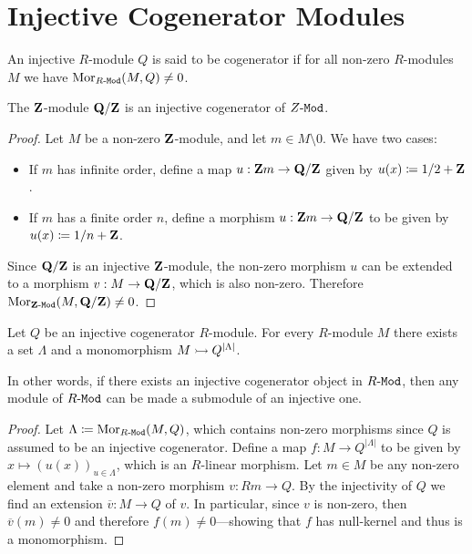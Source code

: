 \section{Injective Cogenerator Modules}

\begin{definition}
\label{def:injective-cogenerator}
An injective \(R\)-module \(Q\) is said to be cogenerator if for all non-zero
\(R\)-modules \(M\) we have \(\operatorname{Mor}_{{R\text{-}\texttt{Mod}}}(M, Q) \neq 0\).
\end{definition}

\begin{lemma}
\label{lem:QZ-is-injective-cogenerator}
The \(\mathbf{Z}\)-module \(\mathbf{Q}/\mathbf{Z}\) is an injective cogenerator of \({Z\text{-}\texttt{Mod}}\).
\end{lemma}

\begin{proof}
Let \(M\) be a non-zero \(\mathbf{Z}\)-module, and let \(m \in M \setminus 0\). We have two cases:
\begin{itemize}\setlength\itemsep{0em}
\item If \(m\) has infinite order, define a map \(u: \mathbf{Z} m \to \mathbf{Q}/\mathbf{Z}\) given by
  \(u(x) \coloneq 1/2 + \mathbf{Z}\).
\item If \(m\) has a finite order \(n\), define a morphism \(u: \mathbf{Z} m \to \mathbf{Q}/\mathbf{Z}\)
  to be given by \(u(x) \coloneq 1/n + \mathbf{Z}\).
\end{itemize}
Since \(\mathbf{Q}/\mathbf{Z}\) is an injective \(\mathbf{Z}\)-module, the non-zero morphism \(u\) can
be extended to a morphism \(v: M \to \mathbf{Q}/\mathbf{Z}\), which is also non-zero. Therefore
\(\operatorname{Mor}_{{\mathbf{Z}\text{-}\texttt{Mod}}}(M, \mathbf{Q}/\mathbf{Z}) \neq 0\).
\end{proof}

\begin{proposition}
\label{prop:inj-cogenerator-product-submodules}
Let \(Q\) be an injective cogenerator \(R\)-module. For every \(R\)-module \(M\)
there exists a set \(\Lambda\) and a monomorphism \(M \rightarrowtail Q^{|\Lambda|}\).

In other words, if there exists an injective cogenerator object in \({R\text{-}\texttt{Mod}}\),
then any module of \({R\text{-}\texttt{Mod}}\) can be made a submodule of an injective one.
\end{proposition}

\begin{proof}
Let \(\Lambda \coloneq \operatorname{Mor}_{{R\text{-}\texttt{Mod}}}(M, Q)\), which contains non-zero morphisms since
\(Q\) is assumed to be an injective cogenerator. Define a map
\(f: M \to Q^{|\Lambda|}\) to be given by \(x \mapsto (u(x))_{u \in \Lambda}\), which is an
\(R\)-linear morphism. Let \(m \in M\) be any non-zero element and take a non-zero
morphism \(v: R m \to Q\). By the injectivity of \(Q\) we find an extension
\(\overline v: M \to Q\) of \(v\). In particular, since \(v\) is non-zero, then
\(\overline v(m) \neq 0\) and therefore \(f(m) \neq 0\)---showing that \(f\) has
null-kernel and thus is a monomorphism.
\end{proof}

